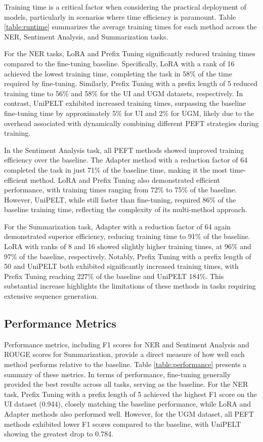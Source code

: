 Training time is a critical factor when considering the practical deployment of models, particularly in scenarios where time efficiency is paramount. Table \ref{table:runtime} summarizes the average training times for each method across the NER, Sentiment Analysis, and Summarization tasks.

For the NER tasks, LoRA and Prefix Tuning significantly reduced training times compared to the fine-tuning baseline. Specifically, LoRA with a rank of 16 achieved the lowest training time, completing the task in 58\% of the time required by fine-tuning. Similarly, Prefix Tuning with a prefix length of 5 reduced training time to 56\% and 58\% for the UI and UGM datasets, respectively. In contrast, UniPELT exhibited increased training times, surpassing the baseline fine-tuning time by approximately 5\% for UI and 2\% for UGM, likely due to the overhead associated with dynamically combining different PEFT strategies during training.

In the Sentiment Analysis task, all PEFT methods showed improved training efficiency over the baseline. The Adapter method with a reduction factor of 64 completed the task in just 71\% of the baseline time, making it the most time-efficient method. LoRA and Prefix Tuning also demonstrated efficient performance, with training times ranging from 72\% to 75\% of the baseline. However, UniPELT, while still faster than fine-tuning, required 86\% of the baseline training time, reflecting the complexity of its multi-method approach.

For the Summarization task, Adapter with a reduction factor of 64 again demonstrated superior efficiency, reducing training time to 91\% of the baseline. LoRA with ranks of 8 and 16 showed slightly higher training times, at 96\% and 97\% of the baseline, respectively. Notably, Prefix Tuning with a prefix length of 50 and UniPELT both exhibited significantly increased training times, with Prefix Tuning reaching 227\% of the baseline and UniPELT 184\%. This substantial increase highlights the limitations of these methods in tasks requiring extensive sequence generation.

\subsection{Performance Metrics}

Performance metrics, including F1 scores for NER and Sentiment Analysis and ROUGE scores for Summarization, provide a direct measure of how well each method performs relative to the baseline. Table \ref{table:performance} presents a summary of these metrics. In terms of performance, fine-tuning generally provided the best results across all tasks, serving as the baseline. For the NER task, Prefix Tuning with a prefix length of 5 achieved the highest F1 score on the UI dataset (0.944), closely matching the baseline performance, while LoRA and Adapter methods also performed well. However, for the UGM dataset, all PEFT methods exhibited lower F1 scores compared to the baseline, with UniPELT showing the greatest drop to 0.784.

